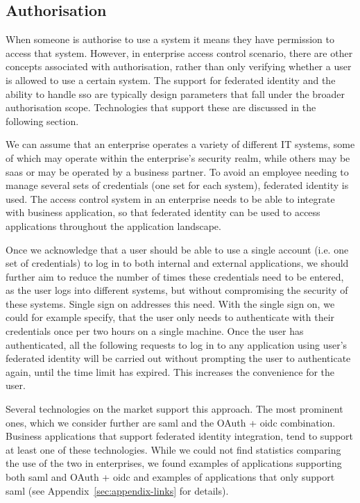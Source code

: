 \subsection{Authorisation}

When someone is authorise to use a system it means they have permission to access that system. However, in enterprise access control scenario, there are other concepts associated with authorisation, rather than only verifying whether a user is allowed to use a certain system. The support for federated identity and the ability to handle \acrfull{sso} are typically design parameters that fall under the broader authorisation scope. Technologies that support these are discussed in the following section.

We can assume that an enterprise operates a variety of different IT systems, some of which may operate within the enterprise's security realm, while others may be \acrshort{saas} or may be operated by a business partner. To avoid an employee needing to manage several sets of credentials (one set for each system), federated identity is used. The access control system in an enterprise needs to be able to integrate with business application, so that federated identity can be used to access applications throughout the application landscape.

Once we acknowledge that a user should be able to use a single account (i.e. one set of credentials) to log in to both internal and external applications, we should further aim to reduce the number of times these credentials need to be entered, as the user logs into different systems, but without compromising the security of these systems. Single sign on addresses this need. With the single sign on, we could for example specify, that the user only needs to authenticate with their credentials once per two hours on a single machine. Once the user has authenticated, all the following requests to log in to any application using user's federated identity will be carried out without prompting the user to authenticate again, until the time limit has expired. This increases the convenience for the user.

Several technologies on the market support this approach. The most prominent ones, which we consider further are \acrshort{saml} and the OAuth + \acrshort{oidc} combination. Business applications that support federated identity integration, tend to support at least one of these technologies. While we could not find statistics comparing the use of the two in enterprises, we found examples of applications supporting both \acrshort{saml} and OAuth + \acrshort{oidc} and examples of applications that only support \acrshort{saml} (see Appendix~\ref{sec:appendix-links} for details). 

